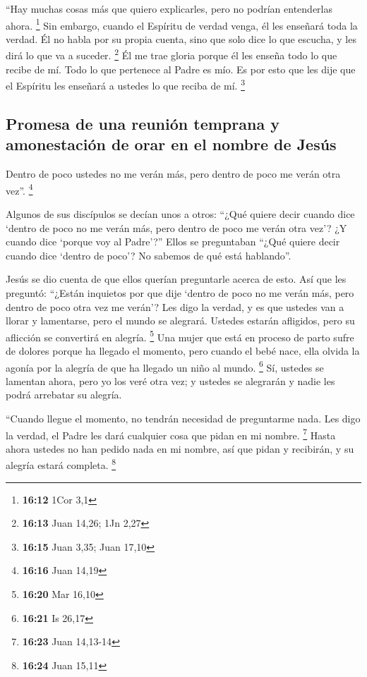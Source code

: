  ``Hay muchas cosas más que quiero explicarles, pero no
podrían entenderlas ahora. \footnote{\textbf{16:12} 1Cor 3,1}
 Sin embargo, cuando el Espíritu de verdad venga, él les
enseñará toda la verdad. Él no habla por su propia cuenta, sino que solo
dice lo que escucha, y les dirá lo que va a suceder. \footnote{\textbf{16:13}
  Juan 14,26; 1Jn 2,27}  Él me trae gloria porque él les
enseña todo lo que recibe de mí.  Todo lo que pertenece
al Padre es mío. Es por esto que les dije que el Espíritu les enseñará a
ustedes lo que reciba de mí. \footnote{\textbf{16:15} Juan 3,35; Juan
  17,10}

\hypertarget{promesa-de-una-reuniuxf3n-temprana-y-amonestaciuxf3n-de-orar-en-el-nombre-de-jesuxfas}{%
\subsection{Promesa de una reunión temprana y amonestación de orar en el
nombre de
Jesús}\label{promesa-de-una-reuniuxf3n-temprana-y-amonestaciuxf3n-de-orar-en-el-nombre-de-jesuxfas}}

 Dentro de poco ustedes no me verán más, pero dentro de
poco me verán otra vez''. \footnote{\textbf{16:16} Juan 14,19}

 Algunos de sus discípulos se decían unos a otros: ``¿Qué
quiere decir cuando dice `dentro de poco no me verán más, pero dentro de
poco me verán otra vez'? ¿Y cuando dice `porque voy al Padre'?''
 Ellos se preguntaban ``¿Qué quiere decir cuando dice
`dentro de poco'? No sabemos de qué está hablando''.

 Jesús se dio cuenta de que ellos querían preguntarle
acerca de esto. Así que les preguntó: ``¿Están inquietos por que dije
`dentro de poco no me verán más, pero dentro de poco otra vez me verán'?
 Les digo la verdad, y es que ustedes van a llorar y
lamentarse, pero el mundo se alegrará. Ustedes estarán afligidos, pero
su aflicción se convertirá en alegría. \footnote{\textbf{16:20} Mar
  16,10}  Una mujer que está en proceso de parto sufre de
dolores porque ha llegado el momento, pero cuando el bebé nace, ella
olvida la agonía por la alegría de que ha llegado un niño al mundo.
\footnote{\textbf{16:21} Is 26,17}  Sí, ustedes se
lamentan ahora, pero yo los veré otra vez; y ustedes se alegrarán y
nadie les podrá arrebatar su alegría.

 ``Cuando llegue el momento, no tendrán necesidad de
preguntarme nada. Les digo la verdad, el Padre les dará cualquier cosa
que pidan en mi nombre. \footnote{\textbf{16:23} Juan 14,13-14}
 Hasta ahora ustedes no han pedido nada en mi nombre, así
que pidan y recibirán, y su alegría estará completa. \footnote{\textbf{16:24}
  Juan 15,11}

